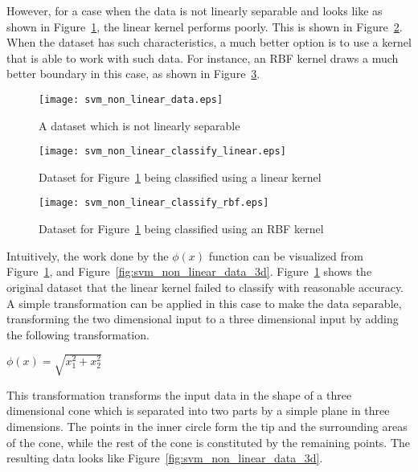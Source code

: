 However, for a case when the data is not linearly separable and looks like as shown in Figure~\ref{fig:svm_non_linear_data}, the linear kernel performs poorly. This is shown in Figure~\ref{fig:svm_non_linear_classify_linear}. When the dataset has such characteristics, a much better option is to use a kernel that is able to work with such data. For instance, an RBF kernel draws a much better boundary in this case, as shown in Figure~\ref{fig:svm_non_linear_classify_rbf}.

\begin{figure}[t!]
    \centering
    \texttt{[image: svm\_non\_linear\_data.eps]}
    \caption{A dataset which is not linearly separable}
    \label{fig:svm_non_linear_data}
\end{figure}

\begin{figure}[t!]
    \centering
    \texttt{[image: svm\_non\_linear\_classify\_linear.eps]}
    \caption{Dataset for Figure~\ref{fig:svm_non_linear_data} being classified using a linear kernel}
    \label{fig:svm_non_linear_classify_linear}
\end{figure}

\begin{figure}[t!]
    \centering
    \texttt{[image: svm\_non\_linear\_classify\_rbf.eps]}
    \caption{Dataset for Figure~\ref{fig:svm_non_linear_data} being classified using an RBF kernel}
    \label{fig:svm_non_linear_classify_rbf}
\end{figure}

Intuitively, the work done by the $\phi(x)$ function can be visualized from Figure~\ref{fig:svm_non_linear_data}, and Figure~\ref{fig:svm_non_linear_data_3d}. Figure~\ref{fig:svm_non_linear_data} shows the original dataset that the linear kernel failed to classify with reasonable accuracy. A simple transformation can be applied in this case to make the data separable, transforming the two dimensional input to a three dimensional input by adding the following transformation.

\begin{center}
    $ \phi(x) = \sqrt{x_1^2 + x_2^2} $
\end{center}

This transformation transforms the input data in the shape of a three dimensional cone which is separated into two parts by a simple plane in three dimensions. The points in the inner circle form the tip and the surrounding areas of the cone, while the rest of the cone is constituted by the remaining points. The resulting data looks like Figure~\ref{fig:svm_non_linear_data_3d}.


